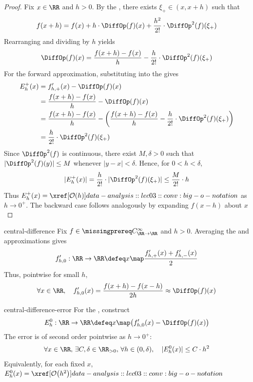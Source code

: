 \documentclass[12pt]{article}
\numberwithin{figure}{section}
\begin{document}
\begin{proof}
  Fix $x\in\RR$ and $h>0$.
  By the ,
  there exists $\xi_+\in(x,x+h)$ such that
  \[
    f(x+h)=f(x)+h\cdot\DiffOp(f)(x)
      +\frac{h^2}{2!}\cdot\DiffOp^2(f)(\xi_+)
  \]
  Rearranging and dividing by $h$ yields
  \[
    \DiffOp(f)(x)=\frac{f(x+h)-f(x)}{h}
      -\frac{h}{2!}\cdot\DiffOp^2(f)(\xi_+)
  \]
  For the forward approximation, substituting into the
   gives
  \[
    \begin{aligned}
      E_h^+(x)
        &=f'_{h,+}(x)-\DiffOp(f)(x)\\
        &=\frac{f(x+h)-f(x)}{h}-\DiffOp(f)(x)\\
        &=\frac{f(x+h)-f(x)}{h}
          -\left(\frac{f(x+h)-f(x)}{h}
            -\frac{h}{2!}\cdot\DiffOp^2(f)(\xi_+)\right)\\
        &=\frac{h}{2!}\cdot\DiffOp^2(f)(\xi_+)
    \end{aligned}
  \]
  Since $\DiffOp^2(f)$ is continuous, there exist $M,\delta>0$ such
  that $|\DiffOp^2(f)(y)|\leq M$ whenever $|y-x|<\delta$.
  Hence, for $0<h<\delta$,
  \[
    |E_h^+(x)|=\frac{h}{2!}\cdot|\DiffOp^2(f)(\xi_+)|
      \leq\frac{M}{2!}\cdot h
  \]
  Thus $E_h^+(x)=\OrderOf{h}$ as $h\to0^+$.
  The backward case follows analogously by expanding $f(x-h)$ about $x$
\end{proof}

\begin{conv}{central-difference}
  Fix $f\in\SmoothRealFunctions$ and $h>0$. Averaging the
   and
   approximations gives
  \[
    f'_{h,0}:\RR\to\RR
      \defeq x\map\frac{f'_{h,+}(x)+f'_{h,-}(x)}{2}
  \]
  Thus, pointwise for small $h$,
  \[
    \forall x\in\RR,\quad
    f'_{h,0}(x)=\frac{f(x+h)-f(x-h)}{2h}\approx\DiffOp(f)(x)
  \]
\end{conv}

\begin{prop}{central-difference-error}
  For the , construct
  \[
    E_h^0:\RR\to\RR
      \defeq x\map\bigl(f'_{h,0}(x)-\DiffOp(f)(x)\bigr)
  \]
  The error is of second order pointwise as $h\to0^+$:
  \[
    \forall x\in\RR,\,\exists C,\delta\in\RR_{>0},\,
    \forall h\in(0,\delta),\quad |E_h^0(x)|\leq C\cdot h^2
  \]
  Equivalently, for each fixed $x$, $E_h^0(x)=\OrderOf{h^2}$
\end{prop}
\end{document}
